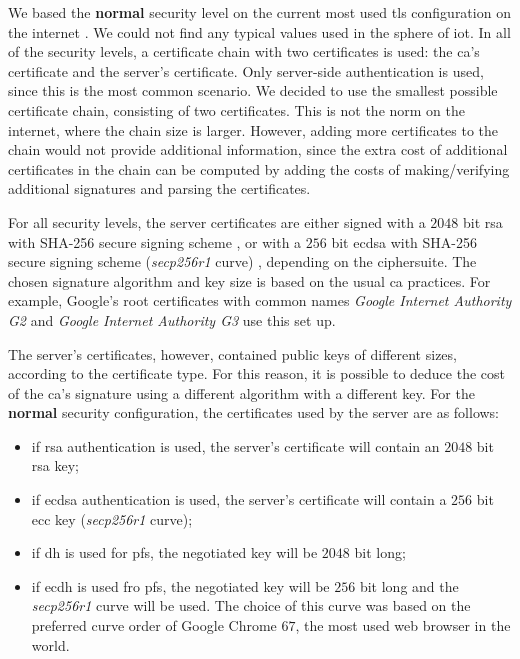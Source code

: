 We based the \textbf{normal} security level on the current most used \gls{tls} configuration on the internet \cite{QualysSS90:online}.
We could not find any typical values used in the sphere of \gls{iot}. In all of the security levels, a
certificate chain with two certificates is used: the \gls{ca}'s certificate
and the server's certificate. Only server-side authentication is used, since this is the most common scenario.
We decided to use the smallest possible certificate chain, consisting of two certificates. This is not the norm
on the internet, where the chain size is larger. However, adding more certificates to the chain would not provide additional
information, since the extra cost of additional certificates in the chain can be computed by adding the costs of
making/verifying additional signatures and parsing the certificates.

For all security levels, the server certificates are either
signed with a $2048$ bit \gls{rsa} with SHA-256 secure signing scheme \cite{RFC8017}, or with a $256$ bit \gls{ecdsa} with SHA-256 secure
signing scheme (\textit{secp256r1} curve) \cite{RFC6979},
depending on the ciphersuite.
The chosen signature algorithm and key size is based on the usual \gls{ca} practices. For example,
Google's root certificates with common names \textit{Google Internet Authority G2} and \textit{Google Internet Authority G3}
use this set up\cite{GoogleIn11:online}.

The server's certificates, however, contained public keys of different sizes, according to the certificate type.
For this reason, it is possible to deduce the cost of the \gls{ca}'s signature using a different algorithm with a
different key. For the \textbf{normal} security configuration, the certificates used by the server are as follows:

\begin{itemize}
  \item if \gls{rsa} authentication is used, the server's certificate will contain an $2048$ bit \gls{rsa} key;
  \item if \gls{ecdsa} authentication is used, the server's certificate will contain a $256$ bit \gls{ecc} key (\textit{secp256r1} curve);
  \item if \gls{dh} is used for \gls{pfs}, the negotiated key will be $2048$ bit long;
  \item if \gls{ecdh} is used fro \gls{pfs}, the negotiated key will be $256$ bit long and the \textit{secp256r1}
  curve will be used. The choice of this curve was based on the preferred curve order of Google Chrome $67$, the most
  used web browser in the world\cite{BrowserS4:online}.
\end{itemize}

